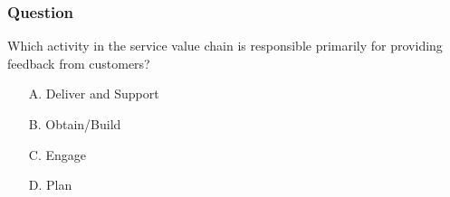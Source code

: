 \documentclass[aspectratio=169, table]{beamer}
\begin{document}
\begin{frame}
	\frametitle{Question}
	
	Which activity in the service value chain is responsible primarily for providing feedback from customers?
	
	\begin{itemize}
		\item[A.] Deliver and Support
		\item[B.] Obtain/Build
		\item[C.] Engage
		\item[D.] Plan
	\end{itemize}
	
\end{frame}
\end{document}
